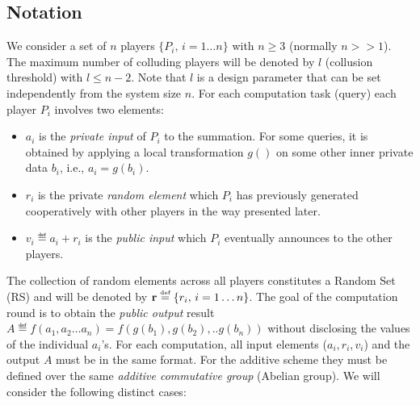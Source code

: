 \documentclass{sig-alternate}
\begin{document}
\subsection{Notation}\label{sec:notation}
We consider a set of $n$ players $\{P_i, \, i=1 \ldots n\}$ with $n \geq 3$ (normally $n>>1$). 
The maximum number of colluding players will be denoted by $l$ (collusion threshold) with $l \leq n-2$.
Note that $l$ is a design parameter that can be set independently from the system size $n$.
For each computation task (query)  each player $P_i$ involves two elements:
\begin{itemize}
\item $a_i$ is the 
\emph{private input} of  $P_i$ to the summation. For some queries, it is obtained by applying a local transformation $g()$ on some other inner private data $b_i$, i.e., $a_i = g(b_i)$.
\item $r_i$ is the private {\em random element} which $P_i$ has previously generated cooperatively with other players in the way presented later.
\item $v_i \eqdef a_i + r_i$ is the {\em public input} which $P_i$ eventually announces to the other players.
\end{itemize}
The collection of random elements across all players constitutes a  Random Set (RS) and will be denoted by ${\bf{r}} \stackrel{\textrm{\tiny def}}{=} \{r_i, \, i=1 \ldots n \}$.
The goal of the computation round is to obtain the {\em public output} result $A \eqdef f(a_1,a_2 \ldots a_n) = f(g(b_1),g(b_2),..g(b_n))$ 
without disclosing the values of the individual $a_i$'s. For each computation, all input elements ($a_i, r_i,v_i$) and the output $A$ must be in the same format.
For the additive scheme they  must be defined over the same 
{\em additive commutative group} (Abelian group).
We will consider the following distinct cases:
\end{document}

